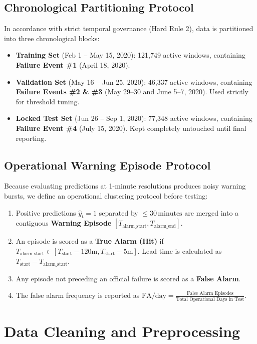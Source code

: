 \documentclass[10pt,twocolumn,a4paper]{article}
\begin{document}
\subsection{Chronological Partitioning Protocol}
In accordance with strict temporal governance (Hard Rule 2), data is partitioned into three chronological blocks:
\begin{itemize}
    \item \textbf{Training Set} (Feb 1 -- May 15, 2020): 121,749 active windows, containing \textbf{Failure Event \#1} (April 18, 2020).
    \item \textbf{Validation Set} (May 16 -- Jun 25, 2020): 46,337 active windows, containing \textbf{Failure Events \#2 \& \#3} (May 29--30 and June 5--7, 2020). Used strictly for threshold tuning.
    \item \textbf{Locked Test Set} (Jun 26 -- Sep 1, 2020): 77,348 active windows, containing \textbf{Failure Event \#4} (July 15, 2020). Kept completely untouched until final reporting.
\end{itemize}

\subsection{Operational Warning Episode Protocol}
Because evaluating predictions at 1-minute resolutions produces noisy warning bursts, we define an operational clustering protocol before testing:
\begin{enumerate}
    \item Positive predictions $\hat{y}_t = 1$ separated by $\le 30\,\text{minutes}$ are merged into a contiguous \textbf{Warning Episode} $[T_{\text{alarm\_start}}, T_{\text{alarm\_end}}]$.
    \item An episode is scored as a \textbf{True Alarm (Hit)} if $T_{\text{alarm\_start}} \in [T_{\text{start}} - 120\text{m}, T_{\text{start}} - 5\text{m}]$. Lead time is calculated as $T_{\text{start}} - T_{\text{alarm\_start}}$.
    \item Any episode not preceding an official failure is scored as a \textbf{False Alarm}.
    \item The false alarm frequency is reported as $\text{FA/day} = \frac{\text{False Alarm Episodes}}{\text{Total Operational Days in Test}}$.
\end{enumerate}

\section{Data Cleaning and Preprocessing}
\end{document}
